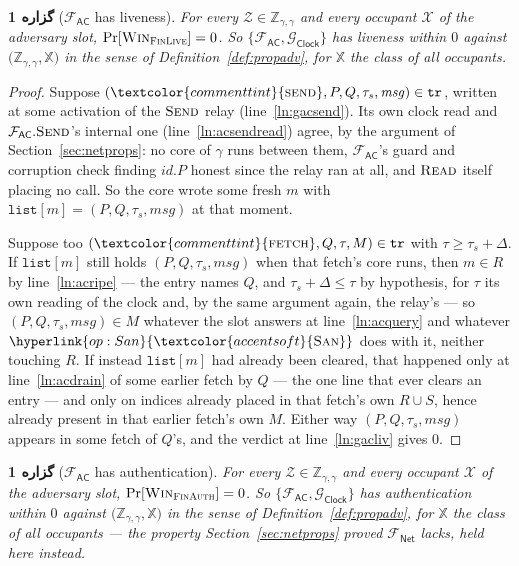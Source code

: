 \documentclass[10pt,oneside,openany]{book}
\newcommand{\Zenv}{\mathcal{Z}}
\newcommand{\ZenvSet}{\mathbb{Z}}
\newcommand{\op}[1]{\textnormal{\textsc{#1}}}
\newcommand{\opl}[1]{\hyperlink{op:#1}{\textcolor{accentsoft}{\op{#1}}}}
\newcommand{\id}{id}
\newcommand{\atom}[1]{\textcolor{commenttint}{\op{#1}}}
\newcommand{\Xset}{\mathbb{X}}
\newcommand{\Win}{\op{Win}}
\newcommand{\Gclock}{\mathcal{G}_{\mathsf{Clock}}}
\newcommand{\Fnet}{\mathcal{F}_{\mathsf{Net}}}
\newcommand{\Fac}{\mathcal{F}_{\mathsf{AC}}}
\newcommand{\msg}{\mathit{msg}}
\newcommand{\San}{\opl{San}}
\newcommand{\V}[1]{\mathtt{#1}}
\theoremstyle{accentdef}
\theoremstyle{accentplain}
\newtheorem{proposition}[definition]{گزاره}
\begin{document}
\begin{proposition}[$\Fac$ has liveness]\label{prop:acliv}
For every $\Zenv \in \ZenvSet_{\gamma,\gamma}$ and every occupant $\mathcal{X}$ of the adversary
slot, $\Pr[\Win_{\op{FinLive}}] = 0$. So $\{\Fac,\Gclock\}$ has liveness within $0$ against
$\bigl(\ZenvSet_{\gamma,\gamma},\Xset\bigr)$ in the sense of Definition~\ref{def:propadv}, for
$\Xset$ the class of all occupants.
\end{proposition}

\begin{proof}
Suppose $(\atom{send},P,Q,\tau_s,\msg) \in \V{tr}$, written at some activation of the $\op{Send}$
relay (line~\ref{ln:gacsend}). Its own clock read and $\Fac.\op{Send}$'s internal one
(line~\ref{ln:acsendread}) agree, by the argument of Section~\ref{sec:netprops}: no core of
$\gamma$ runs between them, $\Fac$'s guard and corruption check finding $\id.P$ honest since the
relay ran at all, and $\op{Read}$ itself placing no call. So the core wrote some fresh $m$ with
$\V{list}[m] = (P,Q,\tau_s,\msg)$ at that moment.

Suppose too $(\atom{fetch},Q,\tau,M) \in \V{tr}$ with $\tau \geq \tau_s + \Delta$. If
$\V{list}[m]$ still holds $(P,Q,\tau_s,\msg)$ when that fetch's core runs, then $m \in R$ by
line~\ref{ln:acripe} --- the entry names $Q$, and $\tau_s + \Delta \leq \tau$ by hypothesis, for
$\tau$ its own reading of the clock and, by the same argument again, the relay's --- so
$(P,Q,\tau_s,\msg) \in M$ whatever the slot answers at line~\ref{ln:acquery} and whatever $\San$
does with it, neither touching $R$. If instead $\V{list}[m]$ had already been cleared, that
happened only at line~\ref{ln:acdrain} of some earlier fetch by $Q$ --- the one line that ever
clears an entry --- and only on indices already placed in that fetch's own $R \cup S$, hence
already present in that earlier fetch's own $M$. Either way $(P,Q,\tau_s,\msg)$ appears in some
fetch of $Q$'s, and the verdict at line~\ref{ln:gacliv} gives $0$.
\end{proof}

\begin{proposition}[$\Fac$ has authentication]\label{prop:acauth}
For every $\Zenv \in \ZenvSet_{\gamma,\gamma}$ and every occupant $\mathcal{X}$ of the adversary
slot, $\Pr[\Win_{\op{FinAuth}}] = 0$. So $\{\Fac,\Gclock\}$ has authentication within $0$ against
$\bigl(\ZenvSet_{\gamma,\gamma},\Xset\bigr)$ in the sense of Definition~\ref{def:propadv}, for
$\Xset$ the class of all occupants --- the property Section~\ref{sec:netprops} proved $\Fnet$
lacks, held here instead.
\end{proposition}
\end{document}
